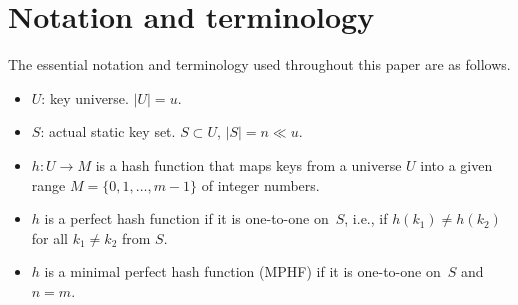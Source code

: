 \vspace{-3mm}
\section{Notation and terminology}
\vspace{-2mm}
\label{sec:notation}

\enlargethispage{2\baselineskip}
The essential notation and terminology used throughout this paper are as follows.
\begin{itemize}
\item $U$: key universe. $|U| = u$.
\item $S$: actual static key set. $S \subset U$, $|S| = n \ll u$.
\item $h: U \to M$ is a hash function that maps keys from a universe $U$ into
a given range $M = \{0,1,\dots,m-1\}$ of integer numbers.
\item $h$ is a perfect hash function if it is one-to-one on~$S$, i.e., if
  $h(k_1) \not = h(k_2)$ for all $k_1 \not = k_2$ from $S$.
\item $h$ is a minimal perfect hash function (MPHF) if it is one-to-one on~$S$ 
  and $n=m$. 
\end{itemize}
